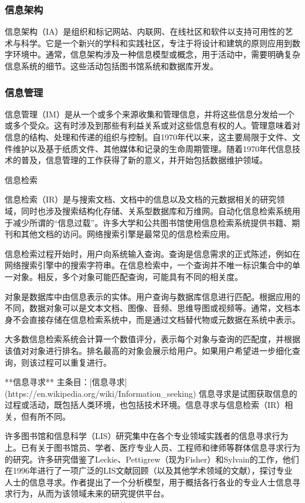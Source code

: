 \subsubsection{信息架构}  
信息架构（IA）是组织和标记网站、内联网、在线社区和软件以支持可用性的艺术与科学。它是一个新兴的学科和实践社区，专注于将设计和建筑的原则应用到数字环境中。通常，信息架构涉及一种信息模型或概念，用于活动中，需要明确复杂信息系统的细节。这些活动包括图书馆系统和数据库开发。
\subsubsection{信息管理} 
信息管理（IM）是从一个或多个来源收集和管理信息，并将这些信息分发给一个或多个受众。这有时涉及到那些有利益关系或对这些信息有权的人。管理意味着对信息的结构、处理和传递的组织与控制。自1970年代以来，这主要局限于文件、文件维护以及基于纸质文件、其他媒体和记录的生命周期管理。随着1970年代信息技术的普及，信息管理的工作获得了新的意义，并开始包括数据维护领域。

信息检索  

信息检索（IR）是与搜索文档、文档中的信息以及文档的元数据相关的研究领域，同时也涉及搜索结构化存储、关系型数据库和万维网。自动化信息检索系统用于减少所谓的“信息过载”。许多大学和公共图书馆使用信息检索系统提供书籍、期刊和其他文档的访问。网络搜索引擎是最常见的信息检索应用。

信息检索过程开始时，用户向系统输入查询。查询是信息需求的正式陈述，例如在网络搜索引擎中的搜索字符串。在信息检索中，一个查询并不唯一标识集合中的单一对象。相反，多个对象可能匹配查询，可能具有不同的相关度。

对象是数据库中由信息表示的实体。用户查询与数据库信息进行匹配。根据应用的不同，数据对象可以是文本文档、图像、音频、思维导图或视频等。通常，文档本身不会直接存储在信息检索系统中，而是通过文档替代物或元数据在系统中表示。

大多数信息检索系统会计算一个数值评分，表示每个对象与查询的匹配度，并根据该值对对象进行排名。排名最高的对象会展示给用户。如果用户希望进一步细化查询，则该过程可以重复进行。

**信息寻求**  
主条目：[信息寻求](https://en.wikipedia.org/wiki/Information_seeking)  
信息寻求是试图获取信息的过程或活动，既包括人类环境，也包括技术环境。信息寻求与信息检索（IR）相关，但有所不同。

许多图书馆和信息科学（LIS）研究集中在各个专业领域实践者的信息寻求行为上。已有关于图书馆员、学者、医疗专业人员、工程师和律师等群体信息寻求行为的研究。许多研究借鉴了Leckie、Pettigrew（现为Fisher）和Sylvain的工作，他们在1996年进行了一项广泛的LIS文献回顾（以及其他学术领域的文献），探讨专业人士的信息寻求。作者提出了一个分析模型，用于概括各行各业的专业人士信息寻求行为，从而为该领域未来的研究提供平台。

